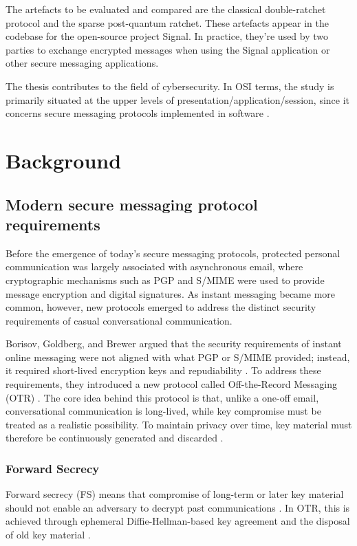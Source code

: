 The artefacts to be evaluated and compared are the classical double-ratchet protocol and the sparse post-quantum ratchet.  These artefacts appear in the codebase for the open-source project Signal. In practice, they’re used by two parties to exchange encrypted messages when using the Signal application or other secure messaging applications. 

The thesis contributes to the field of cybersecurity. In OSI terms, the study is primarily situated at the upper levels of presentation/application/session, since it concerns secure messaging protocols implemented in software \cite{ref25}. 

\section{Background}
\subsection{Modern secure messaging protocol requirements}
Before the emergence of today’s secure messaging protocols, protected personal communication was largely associated with asynchronous email, where cryptographic mechanisms such as PGP and S/MIME were used to provide message encryption and digital signatures. As instant messaging became more common, however, new protocols emerged to address the distinct security requirements of casual conversational communication. \cite{ref10}

 

Borisov, Goldberg, and Brewer argued that the security requirements of instant online messaging were not aligned with what PGP or S/MIME provided; instead, it required short-lived encryption keys and repudiability \cite{ref10}. To address these requirements, they introduced a new protocol called Off-the-Record Messaging (OTR) \cite{ref10}. The core idea behind this protocol is that, unlike a one-off email, conversational communication is long-lived, while key compromise must be treated as a realistic possibility. To maintain privacy over time, key material must therefore be continuously generated and discarded \cite{ref10}. 

\subsubsection{Forward Secrecy}
Forward secrecy (FS) means that compromise of long-term or later key material should not enable an adversary to decrypt past communications \cite{ref11}. In OTR, this is achieved through ephemeral Diffie-Hellman-based key agreement and the disposal of old key material \cite{ref14}. 

